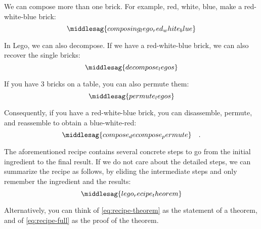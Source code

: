 We can compose more than one brick.
For example, red, white, blue, make a red-white-blue brick:
%
\begin{equation}
    \middlesag{composing_lego_red_white_blue}
\end{equation}

In Lego, we can also decompose.
If we have a red-white-blue brick, we can also recover the single bricks:
%
\begin{equation}
    \middlesag{decompose_legos}
\end{equation}

If you have 3 bricks on a table, you can also permute them:
%
\begin{equation}
    \middlesag{permute_legos}
\end{equation}

Consequently, if you have a red-white-blue brick, you can disassemble, permute, and reassemble to obtain a blue-white-red:
%
\begin{equation}
    \label{eq:recipe-full}
    \middlesag{compose_decompose_permute}\quad.
\end{equation}

The aforementioned recipe contains several concrete steps to go from the initial ingredient to the final result.
If we do not care about the detailed steps, we can summarize the recipe as follows, by eliding the intermediate steps and only remember the ingredient and the results:
%
\begin{equation}
    \label{eq:recipe-theorem}
    \middlesag{lego_recipe_theorem}
\end{equation}

Alternatively, you can think of \cref{eq:recipe-theorem} as the statement of a theorem, and of \cref{eq:recipe-full} as the proof of the theorem.

